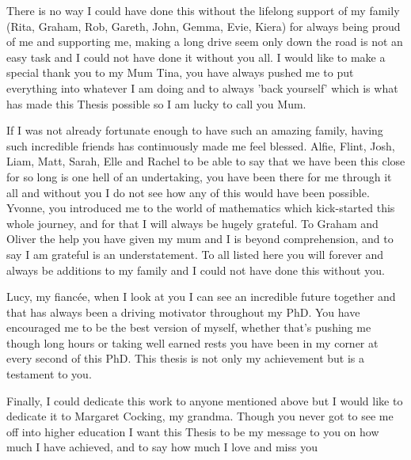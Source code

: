 \documentclass[12pt,english]{report}
\begin{document}
There is no way I could have done this without the lifelong support of my family (Rita, Graham, Rob, Gareth, John, Gemma, Evie, Kiera) for always being proud of me and supporting me, making a long drive seem only down the road is not an easy task and I could not have done it without you all. I would like to make a special thank you to my Mum Tina, you have always pushed me to put everything into whatever I am doing and to always 'back yourself' which is what has made this Thesis possible so I am lucky to call you Mum.

If I was not already fortunate enough to have such an amazing family, having such incredible friends has continuously made me feel blessed. Alfie, Flint, Josh, Liam, Matt, Sarah, Elle and Rachel to be able to say that we have been this close for so long is one hell of an undertaking, you have been there for me through it all and without you I do not see how any of this would have been possible. Yvonne, you introduced me to the world of mathematics which kick-started this whole journey, and for that I will always be hugely grateful. To Graham and Oliver the help you have given my mum and I is beyond comprehension, and to say I am grateful is an understatement. To all listed here you will forever and always be additions to my family and I could not have done this without you. 

Lucy, my fianc\'ee, when I look at you I can see an incredible future together and that has always been a driving motivator throughout my PhD. You have encouraged me to be the best version of myself, whether that's pushing me though long hours or taking well earned rests you have been in my corner at every second of this PhD. This thesis is not only my achievement but is a testament to you.

Finally, I could dedicate this work to anyone mentioned above but I would like to dedicate it to Margaret Cocking, my grandma. Though you never got to see me off into higher education I want this Thesis to be my message to you on how much I have achieved, and to say how much I love and miss you
\vspace*{\fill}

\newpage
\pagestyle{fancy}
\fancyhf{}
\renewcommand{\headrulewidth}{1 pt}
\renewcommand{\headrule}{\hbox to\headwidth{\color{gray}\leaders\hrule height \headrulewidth\hfill}}
\tableofcontents

\newpage
{}

\end{document}

